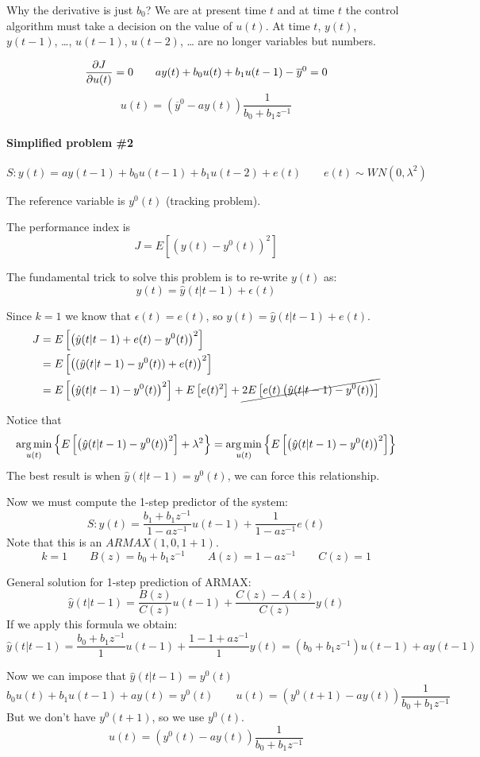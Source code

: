 Why the derivative is just $b_0$? We are at present time $t$ and at time $t$ the control algorithm must take a decision on the value of $u(t)$.
At time $t$, $y(t)$, $y(t-1)$, \dots, $u(t-1)$, $u(t-2)$, \dots{} are no longer variables but numbers.

\[
    \frac{\partial J}{\partial u(t)} = 0 \qquad ay(t)+b_0u(t)+b_1u(t-1)-\overline{y}^0 = 0 \\
\]
\[
    u(t) = \left( \overline{y}^0  - ay(t)\right)\frac{1}{b_0+b_1z^{-1}}
\]

\paragraph{Simplified problem \#2}
\[
    S: y(t) = ay(t-1) + b_0u(t-1) + b_1u(t-2) + e(t) \qquad e(t) \sim WN(0, \lambda^2)
\]

The reference variable is $y^0(t)$ (tracking problem).

The performance index is
\[
    J = E\left[ (y(t) - y^0(t))^2 \right]
\]

The fundamental trick to solve this problem is to re-write $y(t)$ as:
\[
    y(t) = \hat{y}(t|t-1) + \epsilon(t)
\]

Since $k=1$ we know that $\epsilon(t) = e(t)$, so $y(t) = \hat{y}(t|t-1)+e(t)$.
\begin{align*}
    J &= E\left[ \left(\hat{y}(t|t-1)+e(t) - y^0(t)\right)^2 \right] \\
    &= E\left[   \left((\hat{y}(t|t-1)-y^0(t)) +e(t)\right)^2 \right] \\
    &= E\left[ \left(\hat{y}(t|t-1)-y^0(t)\right)^2 \right] + E\left[e(t)^2\right] + \cancel{2E\left[e(t)\left( \hat{y}(t|t-1)-y^0(t) \right)\right]} \\
\end{align*}

Notice that
\[
    \operatorname*{arg\,min}_{u(t)} \left\{ E\left[ \left(\hat{y}(t|t-1)-y^0(t)\right)^2 \right] + \lambda^2 \right\} = \operatorname*{arg\,min}_{u(t)} \left\{ E\left[ \left(\hat{y}(t|t-1)-y^0(t)\right)^2 \right] \right\}
\]
The best result is when $\hat{y}(t|t-1)=y^0(t)$, we can force this relationship.

Now we must compute the 1-step predictor of the system:
\[
    S: y(t) = \frac{b_1+b_1z^{-1}}{1-az^{-1}}u(t-1) + \frac{1}{1-az^{-1}}e(t)
\]
Note that this is an $ARMAX(1,0,1+1)$.
\[
    k=1 \qquad B(z) = b_0+b_1z^{-1} \qquad A(z)=1-az^{-1} \qquad C(z) = 1
\]

General solution for 1-step prediction of ARMAX:
\[
    \hat{y}(t|t-1) = \frac{B(z)}{C(z)}u(t-1) + \frac{C(z)-A(z)}{C(z)}y(t)
\]
If we apply this formula we obtain:
\[
    \hat{y}(t|t-1) = \frac{b_0+b_1z^{-1}}{1}u(t-1) + \frac{1-1+az^{-1}}{1}y(t) = (b_0+b_1z^{-1})u(t-1)+ay(t-1)
\]

Now we can impose that $\hat{y}(t|t-1)=y^0(t)$
\[
    b_0u(t) + b_1u(t-1) + ay(t) = y^0(t) \qquad u(t) = \left( y^0(t+1) - ay(t) \right)\frac{1}{b_0+b_1z^{-1}}
\]
But we don't have $y^0(t+1)$, so we use $y^0(t)$.
\[
    u(t) = \left( y^0(t) - ay(t) \right)\frac{1}{b_0+b_1z^{-1}}
\]
